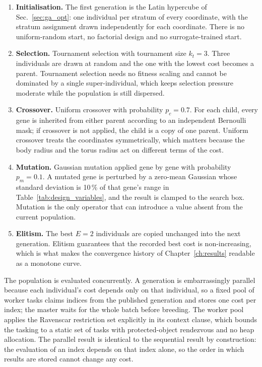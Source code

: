 \begin{enumerate}
    \item \textbf{Initialisation.} The first generation is the Latin hypercube of Sec.~\ref{sec:ga_opt}: one individual per stratum of every coordinate, with the stratum assignment drawn independently for each coordinate. There is no uniform-random start, no factorial design and no surrogate-trained start.

    \item \textbf{Selection.} Tournament selection with tournament size $k_t = 3$. Three individuals are drawn at random and the one with the lowest cost becomes a parent. Tournament selection needs no fitness scaling and cannot be dominated by a single super-individual, which keeps selection pressure moderate while the population is still dispersed.

    \item \textbf{Crossover.} Uniform crossover with probability $p_c = 0.7$. For each child, every gene is inherited from either parent according to an independent Bernoulli mask; if crossover is not applied, the child is a copy of one parent. Uniform crossover treats the coordinates symmetrically, which matters because the body radius and the torus radius act on different terms of the cost.

    \item \textbf{Mutation.} Gaussian mutation applied gene by gene with probability $p_m = 0.1$. A mutated gene is perturbed by a zero-mean Gaussian whose standard deviation is 10\,\% of that gene's range in Table~\ref{tab:design_variables}, and the result is clamped to the search box. Mutation is the only operator that can introduce a value absent from the current population.

    \item \textbf{Elitism.} The best $E = 2$ individuals are copied unchanged into the next generation. Elitism guarantees that the recorded best cost is non-increasing, which is what makes the convergence history of Chapter~\ref{ch:results} readable as a monotone curve.
\end{enumerate}

The population is evaluated concurrently. A generation is embarrassingly parallel because each individual's cost depends only on that individual, so a fixed pool of worker tasks claims indices from the published generation and stores one cost per index; the master waits for the whole batch before breeding. The worker pool applies the Ravenscar restriction set explicitly in its context clause, which bounds the tasking to a static set of tasks with protected-object rendezvous and no heap allocation. The parallel result is identical to the sequential result by construction: the evaluation of an index depends on that index alone, so the order in which results are stored cannot change any cost.

